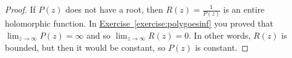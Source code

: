 \documentclass[12pt,openany]{book}
\newcommand{\sabs}[1]{\lvert {#1} \rvert}
\newcommand{\abs}[1]{\left\lvert {#1} \right\rvert}
\theoremstyle{plain}
\theoremstyle{remark}
\theoremstyle{definition}
\theoremstyle{exercise}
\theoremstyle{example}
\newcommand{\exerciseref}[1]{\hyperref[#1]{Exercise~\ref*{#1}}}
\begin{document}
\begin{proof}
If $P(z)$ does not have a root, then $R(z) = \frac{1}{P(z)}$ is
an entire holomorphic function.
In \exerciseref{exercise:polygoesinf} you proved that
$\lim_{z \to \infty} P(z) = \infty$ and so
$\lim_{z \to \infty} R(z) = 0$.  In other words, $R(z)$ is bounded, but then
it would be constant, so $P(z)$ is constant.
%
%
\end{proof}
\end{document}
